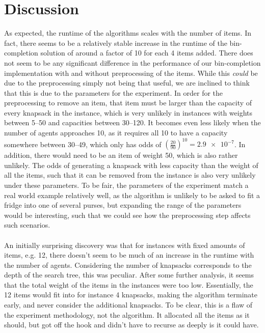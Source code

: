 \documentclass[b5paper]{article}
\begin{document}
\section{Discussion}
As expected, the runtime of the algorithms scales with the number of items.
In fact, there seems to be a relatively stable increase in the runtime of the bin-completion solution of around a factor of 10 for each 4 items added.
There does not seem to be any significant difference in the performance of our bin-completion implementation with and without preprocessing of the items.
While this \emph{could} be due to the preprocessing simply not being that useful, we are inclined to think that this is due to the parameters for the experiment.
In order for the preprocessing to remove an item, that item must be larger than the capacity of every knapsack in the instance, which is very unlikely in instances with weights between 5--50 and capacities between 30--120.
It becomes even less likely when the number of agents approaches 10, as it requires all 10 to have a capacity somewhere between 30--49, which only has odds of $\left(\frac{20}{90}\right)^{10}=\num[exponent-product = \cdot]{2.9e-7}$.
In addition, there would need to be an item of weight 50, which is also rather unlikely.
The odds of generating a knapsack with less capacity than the weight of all the items, such that it can be removed from the instance is also very unlikely under these parameters.
To be fair, the parameters of the experiment match a real world example relatively well, as the algorithm is unlikely to be asked to fit a fridge into one of several purses,
but expanding the range of the parameters would be interesting, such that we could see how the preprocessing step affects such scenarios.
\\ \\
An initially surprising discovery was that for instances with fixed amounts of items, e.g. 12, there doesn't seem to be much of an increase in the runtime with the number of agents.
Considering the number of knapsacks corresponds to the depth of the search tree, this was peculiar.
After some further analysis, it seems that the total weight of the items in the instances were too low.
Essentially, the 12 items would fit into for instance 4 knapsacks, making the algorithm terminate early, and never consider the additional knapsacks.
To be clear, this is a flaw of the experiment methodology, not the algorithm. It allocated all the items as it should, but got off the hook and didn't have to recurse as deeply is it could have. 
\\ \\
\end{document}

